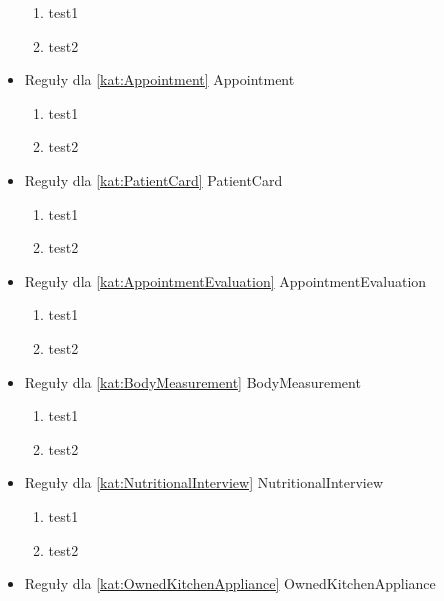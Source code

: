 \begin{itemize}[label={}]
\begin{enumerate}[label={\textbf{REG/\protect\threedigits{\arabic{enumi}}}}, wide, labelwidth=!, resume]
        \item test1
        \item test2
    \end{enumerate}
    \item Reguły dla \ref{kat:Appointment} Appointment
    \begin{enumerate}[label={\textbf{REG/\protect\threedigits{\arabic{enumi}}}}, wide, labelwidth=!, resume]
        \item test1
        \item test2
    \end{enumerate}
    \item Reguły dla \ref{kat:PatientCard} PatientCard
    \begin{enumerate}[label={\textbf{REG/\protect\threedigits{\arabic{enumi}}}}, wide, labelwidth=!, resume]
        \item test1
        \item test2
    \end{enumerate}
    \item Reguły dla \ref{kat:AppointmentEvaluation} AppointmentEvaluation
    \begin{enumerate}[label={\textbf{REG/\protect\threedigits{\arabic{enumi}}}}, wide, labelwidth=!, resume]
        \item test1
        \item test2
    \end{enumerate}
    \item Reguły dla \ref{kat:BodyMeasurement} BodyMeasurement
    \begin{enumerate}[label={\textbf{REG/\protect\threedigits{\arabic{enumi}}}}, wide, labelwidth=!, resume]
        \item test1
        \item test2
    \end{enumerate}
    \item Reguły dla \ref{kat:NutritionalInterview} NutritionalInterview
    \begin{enumerate}[label={\textbf{REG/\protect\threedigits{\arabic{enumi}}}}, wide, labelwidth=!, resume]
        \item test1
        \item test2
    \end{enumerate}
    \item Reguły dla \ref{kat:OwnedKitchenAppliance} OwnedKitchenAppliance
    \begin{enumerate}[label={\textbf{REG/\protect\threedigits{\arabic{enumi}}}}, wide, labelwidth=!, resume]

\end{enumerate}
\end{itemize}
